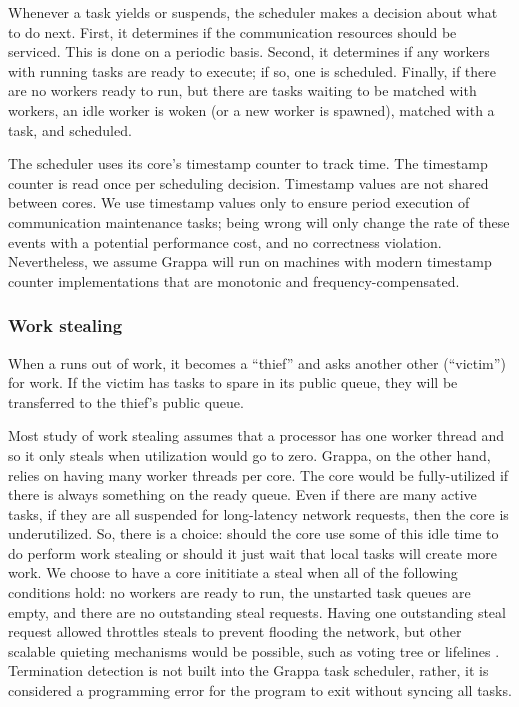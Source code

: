 Whenever a task yields or suspends, the scheduler makes a decision
about what to do next. First, it determines if
the communication resources should be serviced. This is done on a
periodic basis. Second, it determines if any workers with running
tasks are ready to execute; if so, one is scheduled. Finally, if there
are no workers ready to run, but there are tasks waiting to be matched
with workers, an idle worker is woken (or a new worker is spawned),
matched with a task, and scheduled.

The scheduler uses its core's timestamp counter to track time. The
timestamp counter is read once per scheduling decision. Timestamp
values are not shared between cores. We use timestamp values only to
ensure period execution of communication maintenance tasks; being
wrong will only change the rate of these events with a potential
performance cost, and no correctness violation. Nevertheless, we
assume Grappa will run on machines with modern timestamp counter
implementations that are monotonic and frequency-compensated.

\subsubsection{Work stealing} \label{subsec:implementation-worksteal}
When a  runs
out of work, it becomes a ``thief'' and asks another other
 (``victim'') for work. If the victim has tasks
to spare in its public queue, they will be transferred to the thief's public queue.

Most study of work stealing assumes that a processor has one worker
thread and so it only steals when utilization would go to zero. 
Grappa, on the other hand, relies on having many worker threads per core. The
core would be fully-utilized if there is always something on the ready
queue. Even if there are many active tasks, if they are all suspended
for long-latency network requests, then the core is underutilized.
So, there is a choice: should the core use some of this idle time to
do perform work stealing or should it just wait that local tasks will
create more work. We choose to have a core inititiate a steal when all
of the following conditions hold: no workers are ready to run, 
the unstarted task queues are empty, and there are no outstanding steal requests. 
Having one outstanding steal request allowed throttles steals to
prevent flooding the network, but other scalable quieting mechanisms
would be possible, such as voting tree\cite{scalableWorkStealingOrCilk98}
or lifelines \cite{lifelines}. Termination detection is not
built into the Grappa task scheduler, rather, it is considered a programming error for
the program to exit without syncing all tasks.

